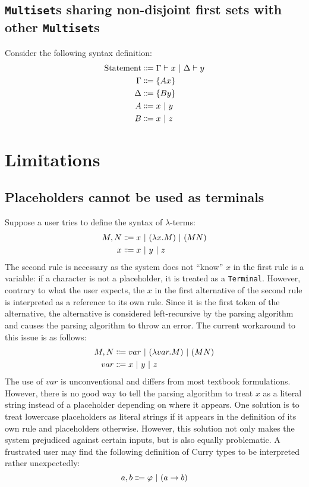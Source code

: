 \subsection{\texorpdfstring{\lstinline{Multiset}}{Multiset}s sharing non-disjoint first sets with other \texorpdfstring{\lstinline{Multiset}}{Multiset}s}
Consider the following syntax definition:
\begin{align*}
    \text{Statement} &\Coloneqq \Gamma \vdash x \ |\  \Delta \vdash y \\
    \Gamma &\Coloneqq \{ Ax \} \\
    \Delta &\Coloneqq \{ By \} \\
    A &\Coloneqq x \ |\  y \\
    B &\Coloneqq x \ |\  z
\end{align*}

\section{Limitations}
\subsection{Placeholders cannot be used as terminals}
Suppose a user tries to define the syntax of $\lambda$-terms:
\begin{align*}
    M, N &\Coloneqq x \ |\  (\lambda x. M) \ |\  (MN) \\
    x &\Coloneqq x \ |\  y \ |\  z
\end{align*}
The second rule is necessary as the system does not ``know'' $x$ in the first rule is a variable: if a character is not a placeholder, it is treated as a \lstinline{Terminal}. However, contrary to what the user expects, the $x$ in the first alternative of the second rule is interpreted as a reference to its own rule. Since it is the first token of the alternative, the alternative is considered left-recursive by the parsing algorithm and causes the parsing algorithm to throw an error. The current workaround to this issue is as follows:
\begin{align*}
    M, N &\Coloneqq var \ |\  (\lambda var. M) \ |\  (MN) \\
    var &\Coloneqq x \ |\  y \ |\  z
\end{align*}
The use of $var$ is unconventional and differs from most textbook formulations. However, there is no good way to tell the parsing algorithm to treat $x$ as a literal string instead of a placeholder depending on where it appears. One solution is to treat lowercase placeholders as literal strings if it appears in the definition of its own rule and placeholders otherwise. However, this solution not only makes the system prejudiced against certain inputs, but is also equally problematic. A frustrated user may find the following definition of Curry types to be interpreted rather unexpectedly:
\[
  a, b \Coloneqq \varphi \ |\  (a \to b)
\]